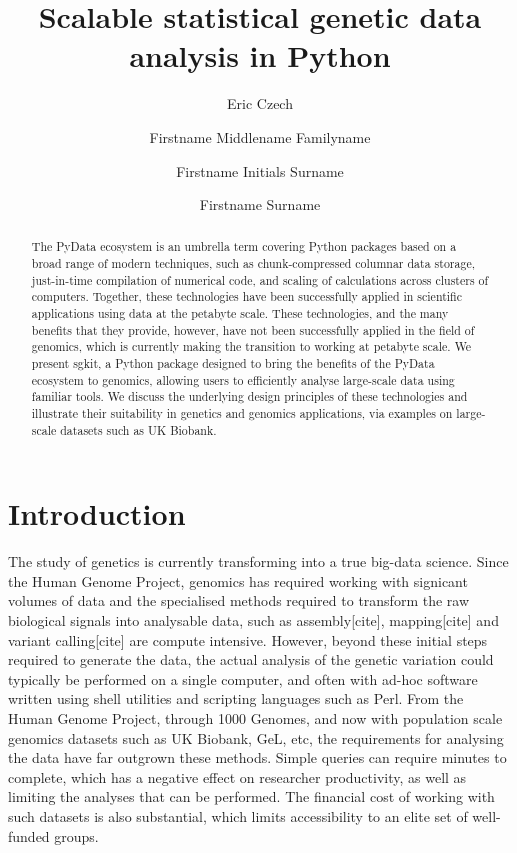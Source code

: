 \documentclass[9pt,lineno]{elife}
\title{Scalable statistical genetic data analysis in Python}
\author[1]{Eric Czech}
\author[1,2\authfn{1}\authfn{3}]{Firstname Middlename Familyname}
\author[2\authfn{1}\authfn{4}]{Firstname Initials Surname}
\author[2*]{Firstname Surname}
\affil[1]{Related Sciences LLC}
\affil[2]{Institution 2}
\begin{document}
\maketitle


\begin{abstract}
The PyData ecosystem is an umbrella term covering Python packages based on a
broad range of modern techniques, such as chunk-compressed columnar data
storage, just-in-time compilation of numerical code, and scaling of
calculations across clusters of computers. Together, these technologies have
been successfully applied in scientific applications using data at the petabyte
scale. These technologies, and the many benefits that they provide, however,
have not been successfully applied in the field of genomics, which is currently
making the transition to working at petabyte scale. We present sgkit, a Python
package designed to bring the benefits of the PyData ecosystem to genomics,
allowing users to efficiently analyse large-scale data using familiar tools. We
discuss the underlying design principles of these technologies and illustrate
their suitability in genetics and genomics applications, via examples on
large-scale datasets such as UK Biobank.
\end{abstract}

\section{Introduction}

The study of genetics is currently transforming into a true big-data science.
Since the Human Genome Project, genomics has required working with
signicant volumes of data and the specialised methods
required to transform the raw biological signals into analysable data,
such as assembly[cite], mapping[cite] and variant calling[cite] are compute intensive.
However, beyond these initial steps required to generate the data, the actual
analysis of the genetic variation could typically be performed on a single
computer, and often with ad-hoc software written using shell utilities
and scripting languages such as Perl.
From the Human Genome Project, through 1000 Genomes, and now with
population scale genomics datasets such as UK Biobank, GeL, etc,
the requirements for analysing the data have far outgrown these
methods. Simple queries can require minutes to complete, which
has a negative effect on researcher productivity, as well as limiting
the analyses that can be performed. The financial cost of working
with such datasets is also substantial, which limits accessibility
to an elite set of well-funded groups.
\end{document}
